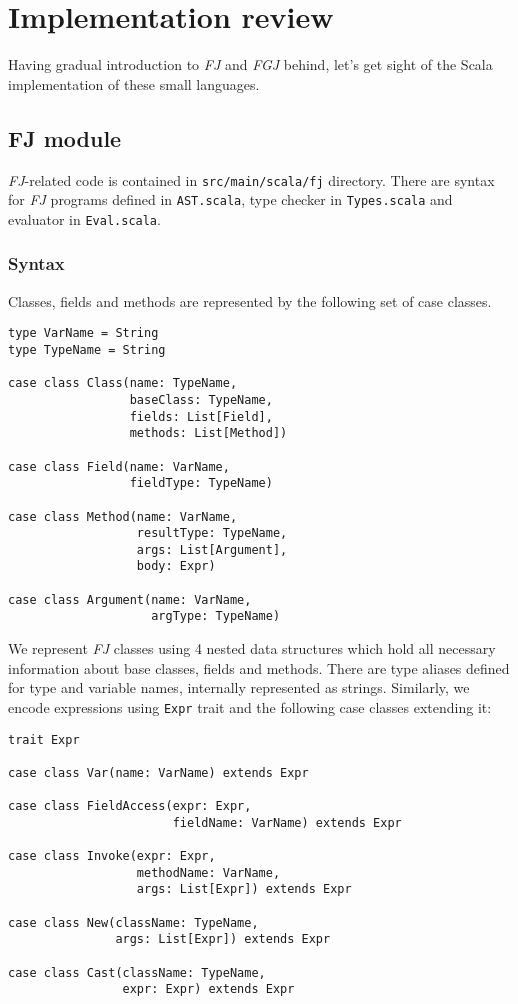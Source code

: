 \documentclass{article}[12pt]
\begin{document}
\section{Implementation review}

Having gradual introduction to \emph{FJ} and \emph{FGJ} behind,
let's get sight of the Scala implementation of these small languages.

\subsection{FJ module}

\emph{FJ}-related code is contained in \texttt{src/main/scala/fj}
directory. There are syntax for \emph{FJ} programs defined in
\texttt{AST.scala}, type checker in \texttt{Types.scala} and
evaluator in \texttt{Eval.scala}.

\subsubsection{Syntax}

Classes, fields and methods are represented by the following set of
case classes.

\begin{verbatim}
type VarName = String
type TypeName = String

case class Class(name: TypeName,
                 baseClass: TypeName,
                 fields: List[Field],
                 methods: List[Method])

case class Field(name: VarName,
                 fieldType: TypeName)

case class Method(name: VarName,
                  resultType: TypeName,
                  args: List[Argument],
                  body: Expr)

case class Argument(name: VarName,
                    argType: TypeName)
\end{verbatim}

We represent \emph{FJ} classes using 4 nested data structures
which hold all necessary information about base classes, fields
and methods. There are type aliases defined for type and variable
names, internally represented as strings. Similarly, we encode
expressions using \texttt{Expr} trait and the following case classes
extending it:

\begin{verbatim}
trait Expr

case class Var(name: VarName) extends Expr

case class FieldAccess(expr: Expr,
                       fieldName: VarName) extends Expr

case class Invoke(expr: Expr,
                  methodName: VarName,
                  args: List[Expr]) extends Expr

case class New(className: TypeName,
               args: List[Expr]) extends Expr

case class Cast(className: TypeName,
                expr: Expr) extends Expr
\end{verbatim}
\end{document}
